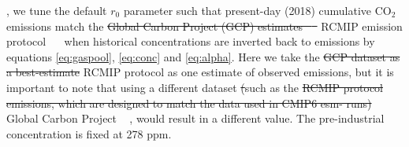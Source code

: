 \documentclass[gmd, manuscript]{copernicus}
\providecommand{\DIFadd}[1]{{\protect\color{blue}#1}} %
\providecommand{\DIFdel}[1]{{\protect\color{red}\sout{#1}}}                      %
\providecommand{\DIFaddbegin}{} %
\providecommand{\DIFaddend}{} %
\providecommand{\DIFdelbegin}{} %
\providecommand{\DIFdelend}{} %
\begin{document}
{}\DIFaddend , we tune the default $r_0$ parameter such that present-day (2018) cumulative CO$_2$ emissions match the \DIFdelbegin \DIFdel{Global Carbon Project (GCP) estimates \mbox{%
\citep{Friedlingstein2019} }\hspace{0pt}%
}\DIFdelend \DIFaddbegin \DIFadd{RCMIP emission protocol \mbox{%
\citep{Nicholls2019} }\hspace{0pt}%
}\DIFaddend when historical concentrations \citep{Meinshausen2017} are inverted back to emissions by equations \ref{eq:gaspool}, \ref{eq:conc} and \ref{eq:alpha}. Here we take the \DIFdelbegin \DIFdel{GCP dataset as a best-estimate }\DIFdelend \DIFaddbegin \DIFadd{RCMIP protocol as one estimate }\DIFaddend of observed emissions, but it is important to note that using a different dataset \DIFdelbegin \DIFdel{(}\DIFdelend such as the \DIFdelbegin \DIFdel{RCMIP protocol emissions, which are designed to match the data used in CMIP6 esm- runs) }\DIFdelend \DIFaddbegin \DIFadd{Global Carbon Project \mbox{%
\citep{Friedlingstein2019}}\hspace{0pt}%
, }\DIFaddend would result in a different value. The pre-industrial concentration is fixed at 278 ppm.
\end{document}

